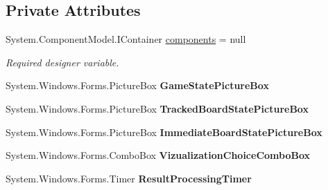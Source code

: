\subsection*{Private Attributes}
\begin{DoxyCompactItemize}
\item 
System.\+Component\+Model.\+I\+Container \mbox{\hyperlink{class_chess_tracking_1_1_user_interface_1_1_main_game_form_a4b5439262b37e795a0c642d3558ee1cf}{components}} = null
\begin{DoxyCompactList}\small\item\em Required designer variable. \end{DoxyCompactList}\item 
\mbox{\label{class_chess_tracking_1_1_user_interface_1_1_main_game_form_a21f87d70671dcaee9e45f6ffdbd18953}} 
System.\+Windows.\+Forms.\+Picture\+Box {\bfseries Game\+State\+Picture\+Box}
\item 
\mbox{\label{class_chess_tracking_1_1_user_interface_1_1_main_game_form_a2abb004856de62e8938755bfaaaa8c03}} 
System.\+Windows.\+Forms.\+Picture\+Box {\bfseries Tracked\+Board\+State\+Picture\+Box}
\item 
\mbox{\label{class_chess_tracking_1_1_user_interface_1_1_main_game_form_a7617a83217f15b671983519173708f95}} 
System.\+Windows.\+Forms.\+Picture\+Box {\bfseries Immediate\+Board\+State\+Picture\+Box}
\item 
\mbox{\label{class_chess_tracking_1_1_user_interface_1_1_main_game_form_a017f71d2139794aea13038968b220f17}} 
System.\+Windows.\+Forms.\+Combo\+Box {\bfseries Vizualization\+Choice\+Combo\+Box}
\item 
\mbox{\label{class_chess_tracking_1_1_user_interface_1_1_main_game_form_ab236c10271d23c4016bf4ccd90beb239}} 
System.\+Windows.\+Forms.\+Timer {\bfseries Result\+Processing\+Timer}
\item 
\mbox{\label{class_chess_tracking_1_1_user_interface_1_1_main_game_form_a7e1552d44826641cda32c7d74709d2a8}} 

\end{DoxyCompactItemize}
